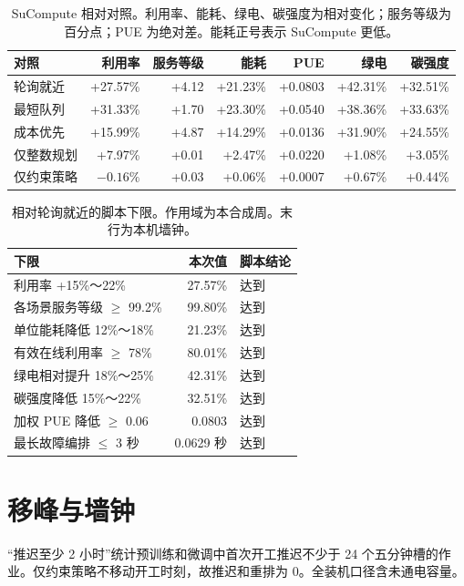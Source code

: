 \begin{table}[ht]
\centering
\caption{SuCompute 相对对照。利用率、能耗、绿电、碳强度为相对变化；服务等级为百分点；PUE 为绝对差。能耗正号表示 SuCompute 更低。}
\footnotesize
\setlength{\tabcolsep}{3.5pt}
\begin{tabular}{lrrrrrr}
\toprule
对照 & 利用率 & 服务等级 & 能耗 & PUE & 绿电 & 碳强度 \\
\midrule
轮询就近 & +27.57\% & +4.12 & +21.23\% & +0.0803 & +42.31\% & +32.51\% \\
最短队列 & +31.33\% & +1.70 & +23.30\% & +0.0540 & +38.36\% & +33.63\% \\
成本优先 & +15.99\% & +4.87 & +14.29\% & +0.0136 & +31.90\% & +24.55\% \\
仅整数规划 & +7.97\% & +0.01 & +2.47\% & +0.0220 & +1.08\% & +3.05\% \\
仅约束策略 & $-0.16\%$ & +0.03 & +0.06\% & +0.0007 & +0.67\% & +0.44\% \\
\bottomrule
\end{tabular}
\end{table}

\begin{table}[ht]
\centering
\caption{相对轮询就近的脚本下限。作用域为本合成周。末行为本机墙钟。}
\begin{tabular}{lrl}
\toprule
下限 & 本次值 & 脚本结论 \\
\midrule
利用率 +15\%～22\% & 27.57\% & 达到 \\
各场景服务等级 $\ge$ 99.2\% & 99.80\% & 达到 \\
单位能耗降低 12\%～18\% & 21.23\% & 达到 \\
有效在线利用率 $\ge$ 78\% & 80.01\% & 达到 \\
绿电相对提升 18\%～25\% & 42.31\% & 达到 \\
碳强度降低 15\%～22\% & 32.51\% & 达到 \\
加权 PUE 降低 $\ge$ 0.06 & 0.0803 & 达到 \\
最长故障编排 $\le$ 3 秒 & 0.0629 秒 & 达到 \\
\bottomrule
\end{tabular}
\end{table}

\section{移峰与墙钟}
“推迟至少 2 小时”统计预训练和微调中首次开工推迟不少于 24 个五分钟槽的作业。仅约束策略不移动开工时刻，故推迟和重排为 0。全装机口径含未通电容量。

